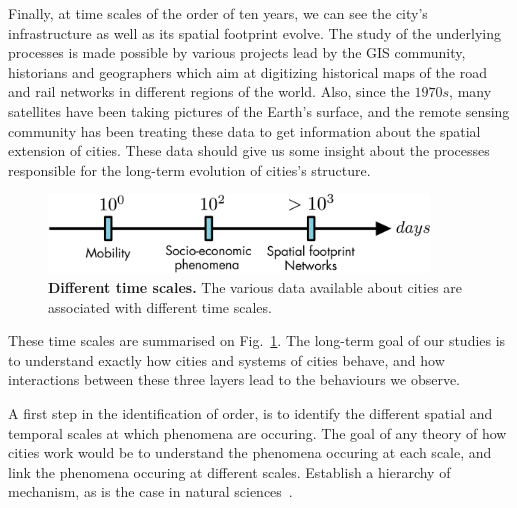 Finally, at time scales of the order of ten years, we can see the city's
infrastructure as well as its spatial footprint evolve. The study of the
underlying processes is made possible by various projects lead by the GIS
community, historians and geographers which aim at digitizing historical maps of
the road and rail networks in different regions of the world. Also, since the
$1970s$, many satellites have been taking pictures of the Earth's surface, and
the remote sensing community has been treating these data to get information
about the spatial extension of cities. These data should give us some insight
about the processes responsible for the long-term evolution of cities's
structure.\\

\begin{figure}[!h]
    \centering
    \includegraphics[width=0.9\textwidth]{./gfx/chapter-intro/time_scales.pdf}
    \caption{{\bf Different time scales.} The various data available about
    cities are associated with different time scales.\label{fig:timescale}}
\end{figure}

These time scales are summarised on Fig.~\ref{fig:timescale}. The long-term goal of our studies is to understand exactly how cities and systems of cities behave, and how interactions between these three layers lead to the behaviours we observe. 





A first step in the identification of order, is to identify the different
spatial and temporal scales at which phenomena are occuring. The goal of any
theory of how cities work would be to understand the phenomena occuring at each
scale, and link the phenomena occuring at different scales. Establish a
hierarchy of mechanism, as is the case in natural sciences~\cite{Simon:1962}.

